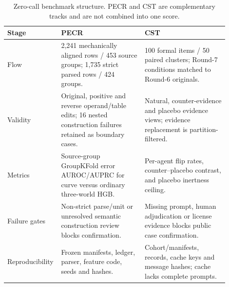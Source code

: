 \begin{table}[t]
\centering\small
\caption{Zero-call benchmark structure. PECR and CST are complementary tracks and are not combined into one score.}
\begin{tabular}{p{0.16\linewidth}p{0.37\linewidth}p{0.37\linewidth}}
\toprule
Stage & PECR & CST\\
\midrule
Flow & 2,241 mechanically aligned rows / 453 source groups; 1,735 strict parsed rows / 424 groups. & 100 formal items / 50 paired clusters; Round-7 conditions matched to Round-6 originals.\\
Validity & Original, positive and reverse operand/table edits; 16 nested construction failures retained as boundary cases. & Natural, counter-evidence and placebo evidence views; evidence replacement is partition-filtered.\\
Metrics & Source-group GroupKFold error AUROC/AUPRC for curve versus ordinary three-world HGB. & Per-agent flip rates, counter--placebo contrast, and placebo inertness ceiling.\\
Failure gates & Non-strict parse/unit or unresolved semantic construction review blocks confirmation. & Missing prompt, human adjudication or license evidence blocks public case confirmation.\\
Reproducibility & Frozen manifests, ledger, parser, feature code, seeds and hashes. & Cohort/manifests, records, cache keys and message hashes; cache lacks complete prompts.\\
\bottomrule
\end{tabular}
\end{table}

